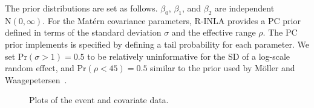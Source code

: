 \documentclass[]{interact}
\begin{document}
The prior distributions are set as follows. \(\beta_{0}\), \(\beta_{1}\), and
\(\beta_{2}\) are independent \(\mathrm{N}(0, \infty)\). For the Mat\'{e}rn
covariance parameters, R-INLA provides a PC prior defined in terms of the
standard deviation \(\sigma\) and the effective range \(\rho\). The PC prior
implements is specified by defining a tail probability for each parameter. We
set \(\mathrm{Pr}(\sigma > 1) = 0.5\) to be relatively uninformative for the
SD of a log-scale random effect, and \(\mathrm{Pr}(\rho < 45) = 0.5\) similar
to the prior used by M\"{o}ller and Waagepetersen~\cite{moellerwaagepetersen}.

\begin{figure}[p]




\caption{Plots of the event and covariate data.}
\label{bei}
\end{figure}
\end{document}
